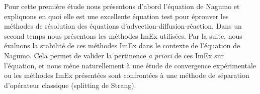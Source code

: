 Pour cette première étude nous présentons d'abord l'équation de Nagumo et expliquons en quoi 
elle est une excellente équation test pour éprouver les méthodes de résolution des équations d'advection-diffusion-réaction. 
Dans un second temps nous présentons les méthodes ImEx utilisées.
Par la suite, nous évaluons la stabilité de ces méthodes ImEx dans le contexte de l'équation de Nagumo.
Cela permet de valider la pertinence \textit{a priori} de ces ImEx sur l'équation, et nous mène naturellement à une étude de convergence expérimentale
ou les méthodes ImEx présentées sont confrontées à une méthode de séparation d'opérateur classique (splitting de Strang).
